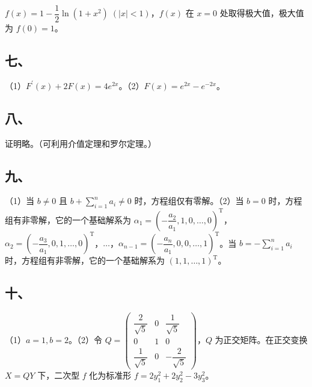 \documentclass[UTF8,12pt]{ctexart}
\begin{document}
\(\displaystyle f(x)=1-\dfrac{\displaystyle 1}{\displaystyle 2}\ln(1+x^2)\;(|x|<1)\)，\(\displaystyle f(x)\) 在 \(\displaystyle x=0\) 处取得极大值，极大值为 \(\displaystyle f(0)=1\)。


\subsection*{七、}

（1）\(\displaystyle F^{\prime}(x)+2F(x)=4e^{2x}\)。（2）\(\displaystyle F(x)=e^{2x}-e^{-2x}\)。


\subsection*{八、}

证明略。（可利用介值定理和罗尔定理。）


\subsection*{九、}

（1）当 \(\displaystyle b\ne0\) 且 \(\displaystyle b+\displaystyle \sum_{i=1}^na_i\ne0\) 时，方程组仅有零解。（2）当 \(\displaystyle b=0\) 时，方程组有非零解，它的一个基础解系为 \(\displaystyle \alpha_1=(-\dfrac{\displaystyle a_2}{\displaystyle a_1},\allowbreak 1,\allowbreak 0,\allowbreak \ldots,\allowbreak 0)^{\mathrm T}\)，\(\displaystyle \alpha_2=(-\dfrac{\displaystyle a_3}{\displaystyle a_1},\allowbreak 0,\allowbreak 1,\allowbreak \ldots,\allowbreak 0)^{\mathrm T}\)，\(\displaystyle \ldots\)，\(\displaystyle \alpha_{n-1}=(-\dfrac{\displaystyle a_n}{\displaystyle a_1},\allowbreak 0,\allowbreak 0,\allowbreak \ldots,\allowbreak 1)^{\mathrm T}\)。当 \(\displaystyle b=-\displaystyle \sum_{i=1}^na_i\) 时，方程组有非零解，它的一个基础解系为 \(\displaystyle (1,\allowbreak 1,\allowbreak \ldots,\allowbreak 1)^{\mathrm T}\)。


\subsection*{十、}

（1）\(\displaystyle a=1,\allowbreak b=2\)。（2）令 \(\displaystyle Q=\begin{pmatrix}\dfrac{\displaystyle 2}{\displaystyle \sqrt5}&0&\dfrac{\displaystyle 1}{\displaystyle \sqrt5}\\0&1&0\\\dfrac{\displaystyle 1}{\displaystyle \sqrt5}&0&-\dfrac{\displaystyle 2}{\displaystyle \sqrt5}\end{pmatrix}\)，\(\displaystyle Q\) 为正交矩阵。在正交变换 \(\displaystyle X=QY\) 下，二次型 \(\displaystyle f\) 化为标准形 \(\displaystyle f=2y_1^2+2y_2^2-3y_3^2\)。
\end{document}
